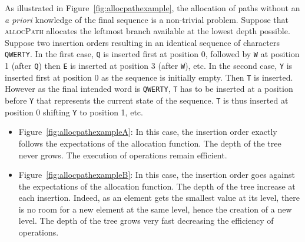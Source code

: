 \begin{figure*}
  \centering
  \hspace{50pt}
  \caption{\label{fig:allocpathexample} Two trees filled with the resulting
    identifiers of two different permutations resulting in an identical sequence
    \texttt{QWERTY}. The function \textsc{allocPath} allocates the leftmost
    branch in the tree. All paths of the optimal case have a length of 1 while
    the tree of the worst case grows up to a depth of 6.}
\end{figure*}

As illustrated in Figure~\ref{fig:allocpathexample}, the allocation of paths
without an \emph{a priori} knowledge of the final sequence is a non-trivial
problem.  Suppose that \textsc{allocPath} allocates the leftmost branch
available at the lowest depth possible. Suppose two insertion orders resulting
in an identical sequence of characters \texttt{QWERTY}.  In the first case,
\texttt{Q} is inserted first at position 0, followed by \texttt{W} at position 1
(after \texttt{Q}) then \texttt{E} is inserted at position 3 (after \texttt{W}),
etc.  In the second case, \texttt{Y} is inserted first at position 0 as the
sequence is initially empty. Then \texttt{T} is inserted. However as the final
intended word is \texttt{QWERTY}, \texttt{T} has to be inserted at a position
before \texttt{Y} that represents the current state of the sequence. \texttt{T}
is thus inserted at position 0 shifting \texttt{Y} to position 1, etc.


\begin{itemize}[noitemsep, leftmargin=*]
\item Figure~\ref{fig:allocpathexampleA}: In this case, the insertion order
  exactly follows the expectations of the allocation function. The depth of the
  tree never grows. The execution of operations remain efficient.

\item Figure~\ref{fig:allocpathexampleB}: In this case, the insertion order goes
  against the expectations of the allocation function. The depth of the tree
  increase at each insertion. Indeed, as an element gets the smallest value at
  its level, there is no room for a new element at the same level, hence the
  creation of a new level. The depth of the tree grows very fast decreasing the
  efficiency of operations.
\end{itemize}

